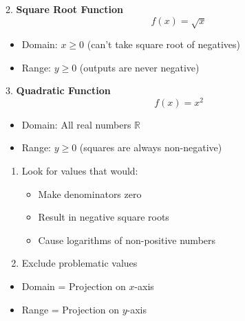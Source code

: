 \documentclass{article} %
\begin{document}
2. \textbf{Square Root Function}
\[
f(x) = \sqrt{x}
\]
\begin{itemize}
    \item Domain: $x \geq 0$ (can't take square root of negatives)
    \item Range: $y \geq 0$ (outputs are never negative)
\end{itemize}

3. \textbf{Quadratic Function}
\[
f(x) = x^2
\]
\begin{itemize}
    \item Domain: All real numbers $\mathbb{R}$
    \item Range: $y \geq 0$ (squares are always non-negative)
\end{itemize}

\begin{enumerate}
    \item Look for values that would:
    \begin{itemize}
        \item Make denominators zero
        \item Result in negative square roots
        \item Cause logarithms of non-positive numbers
    \end{itemize}
    \item Exclude problematic values
\end{enumerate}

\begin{itemize}
    \item Domain = Projection on $x$-axis
    \item Range = Projection on $y$-axis
\end{itemize}
\end{document}
